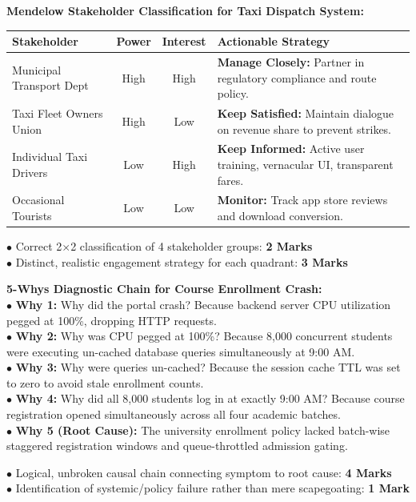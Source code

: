 \begin{solutionbox}
\textbf{Mendelow Stakeholder Classification for Taxi Dispatch System:}\\
\begin{tabularx}{\linewidth}{|l|c|c|X|} \hline
\textbf{Stakeholder} & \textbf{Power} & \textbf{Interest} & \textbf{Actionable Strategy} \\ \hline
Municipal Transport Dept & High & High & \textbf{Manage Closely:} Partner in regulatory compliance and route policy. \\ \hline
Taxi Fleet Owners Union & High & Low & \textbf{Keep Satisfied:} Maintain dialogue on revenue share to prevent strikes. \\ \hline
Individual Taxi Drivers & Low & High & \textbf{Keep Informed:} Active user training, vernacular UI, transparent fares. \\ \hline
Occasional Tourists & Low & Low & \textbf{Monitor:} Track app store reviews and download conversion. \\ \hline
\end{tabularx}
\begin{markingrubric}
$\bullet$ Correct 2$\times$2 classification of 4 stakeholder groups: \textbf{2 Marks}\\
$\bullet$ Distinct, realistic engagement strategy for each quadrant: \textbf{3 Marks}
\end{markingrubric}
\end{solutionbox}

\begin{solutionbox}
\textbf{5-Whys Diagnostic Chain for Course Enrollment Crash:}\\
$\bullet$ \textbf{Why 1:} Why did the portal crash? Because backend server CPU utilization pegged at 100\%, dropping HTTP requests.\\
$\bullet$ \textbf{Why 2:} Why was CPU pegged at 100\%? Because 8,000 concurrent students were executing un-cached database queries simultaneously at 9:00 AM.\\
$\bullet$ \textbf{Why 3:} Why were queries un-cached? Because the session cache TTL was set to zero to avoid stale enrollment counts.\\
$\bullet$ \textbf{Why 4:} Why did all 8,000 students log in at exactly 9:00 AM? Because course registration opened simultaneously across all four academic batches.\\
$\bullet$ \textbf{Why 5 (Root Cause):} The university enrollment policy lacked batch-wise staggered registration windows and queue-throttled admission gating.
\begin{markingrubric}
$\bullet$ Logical, unbroken causal chain connecting symptom to root cause: \textbf{4 Marks}\\
$\bullet$ Identification of systemic/policy failure rather than mere scapegoating: \textbf{1 Mark}
\end{markingrubric}
\end{solutionbox}

